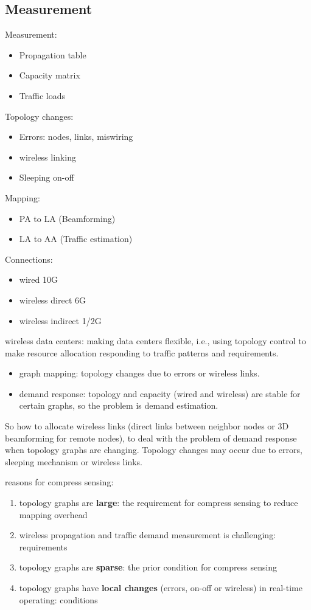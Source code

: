 \documentclass[journal,onecolumn,11pt]{IEEEtran}
\begin{document}
\subsection{Measurement}

Measurement:
\begin{itemize}
  \item Propagation table
  \item Capacity matrix
  \item Traffic loads
\end{itemize}

Topology changes:
\begin{itemize}
  \item Errors: nodes, links, miswiring
  \item wireless linking
  \item Sleeping on-off
\end{itemize}

Mapping:
\begin{itemize}
  \item PA to LA (Beamforming)
  \item LA to AA (Traffic estimation)
\end{itemize}

Connections:
\begin{itemize}
  \item wired 10G
  \item wireless direct 6G
  \item wireless indirect 1/2G
\end{itemize}

wireless data centers: making data centers flexible, i.e., using topology control to make resource allocation responding to traffic patterns and requirements.
\begin{itemize}
  \item graph mapping: topology changes due to errors or wireless links.
  \item demand response: topology and capacity (wired and wireless) are stable for certain graphs, so the problem is demand estimation.
\end{itemize}
So how to allocate wireless links (direct links between neighbor nodes or 3D beamforming for remote nodes), to deal with the problem of demand response when topology graphs are changing. Topology changes may occur due to errors, sleeping mechanism or wireless links.

reasons for compress sensing:
\begin{enumerate}
  \item topology graphs are \textbf{large}: the requirement for compress sensing to reduce mapping overhead
  \item wireless propagation and traffic demand measurement is challenging: requirements
  \item topology graphs are \textbf{sparse}: the prior condition for compress sensing
  \item topology graphs have \textbf{local changes} (errors, on-off or wireless) in real-time operating: conditions
\end{enumerate}
\end{document}
